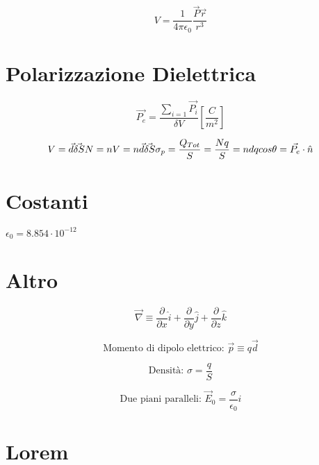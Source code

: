 \documentclass[a4paper,11pt]{article}
\begin{document}
\begin{multicols}{3}
		\begin{equation}
			V = \frac{1}{4 \pi \epsilon_0} \frac{\vec{P}\vec{r}}{r^3}
		\end{equation}
	
		\section{Polarizzazione Dielettrica}
		\begin{equation}
			\vec{P_e} = \frac{\sum_{i=1}\vec{P_i}}{\delta V} \left[\frac{C}{m^2}\right]
		\end{equation}
	
		\begin{equation}
			V = \vec{d} \vec{\delta S} \\
			N = nV = n\vec{d} \vec{\delta S} \\
			\sigma_p = \frac{Q_{Tot}}{S} = \frac{Nq}{S} = ndqcos\theta = \vec{P_e} \cdot \hat{n}
		\end{equation}
	
	
	
	
	
	
	
	
	
	
		
		
		\section{Costanti}
		$\epsilon_{0}=8.854 \cdot 10^{-12}$
		
		
		
		\section{Altro}
		
		\begin{equation}
			\vec{\nabla} \equiv
			\frac{\partial}{\partial x}\hat{i} +
			\frac{\partial}{\partial y}\hat{j} +
			\frac{\partial}{\partial z}\hat{k}
		\end{equation}
		
		\begin{equation}
			\text{Momento di dipolo elettrico: }\vec{p} \equiv q \vec{d}
		\end{equation}
		
		\begin{equation}
			\text{Densità: } \sigma = \frac{q}{S}
		\end{equation}
		
		\begin{equation}
			\text{Due piani paralleli: }\vec{E}_0 = \frac{\sigma}{\epsilon_0} \hat{i}
		\end{equation}
		
		
		
		
		
		\section{Lorem}
		\lipsum[1-10]
	\end{multicols}
	
\end{document}
